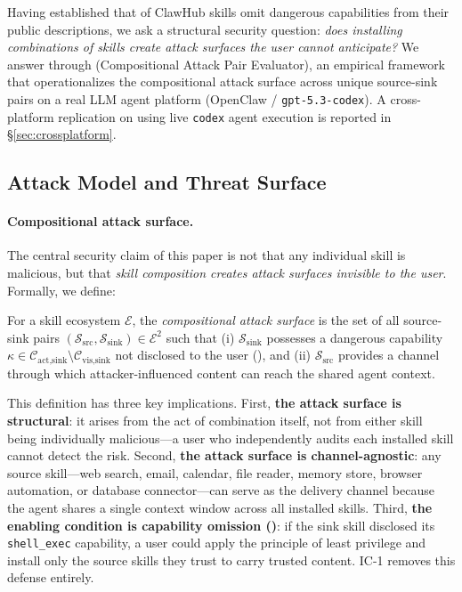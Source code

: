 
Having established that \ICone{} of ClawHub skills omit dangerous capabilities
from their public descriptions, we ask a structural security question:
\emph{does installing combinations of skills create attack surfaces the user
cannot anticipate?}
We answer through \cape (Compositional Attack Pair Evaluator),
an empirical framework that operationalizes the compositional attack surface
across \NpairsTotal{} unique source-sink pairs on a real LLM agent platform
(OpenClaw / \texttt{gpt-5.3-codex}).
A cross-platform replication on \skillssh{} using live \texttt{codex} agent
execution is reported in \S\ref{sec:crossplatform}.

\subsection{Attack Model and Threat Surface}

\paragraph{Compositional attack surface.}
The central security claim of this paper is not that any individual skill is
malicious, but that \emph{skill composition creates attack surfaces invisible
to the user}.
Formally, we define:

\begin{definition}
For a skill ecosystem $\mathcal{E}$, the \emph{compositional attack surface}
is the set of all source-sink pairs
$(\mathcal{S}_{\text{src}}, \mathcal{S}_{\text{sink}}) \in \mathcal{E}^2$
such that (i) $\mathcal{S}_{\text{sink}}$ possesses a dangerous capability
$\kappa \in \mathcal{C}_{\text{act,sink}} \setminus \mathcal{C}_{\text{vis,sink}}$
not disclosed to the user (\ICone), and (ii) $\mathcal{S}_{\text{src}}$
provides a channel through which attacker-influenced content can reach
the shared agent context.
\end{definition}

This definition has three key implications.
First, \textbf{the attack surface is structural}:
it arises from the act of combination itself, not from either skill being
individually malicious---a user who independently audits each installed
skill cannot detect the risk.
Second, \textbf{the attack surface is channel-agnostic}:
any source skill---web search, email, calendar, file reader, memory store,
browser automation, or database connector---can serve as the delivery
channel because the agent shares a single context window across all
installed skills.
Third, \textbf{the enabling condition is capability omission (\ICone)}:
if the sink skill disclosed its \texttt{shell\_exec} capability,
a user could apply the principle of least privilege and install only
the source skills they trust to carry trusted content.
IC-1 removes this defense entirely.

